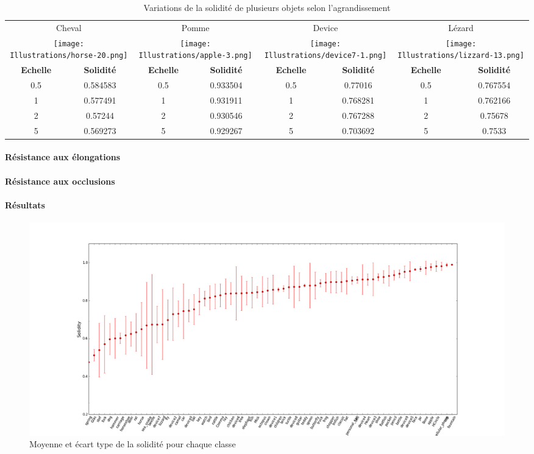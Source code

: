 \documentclass{article}
\theoremstyle{definition}
\begin{document}
	  \begin{table}[!h]
	  \centering
	  \begin{tabular}{|c|c|c|c|c|c|c|c|}
	    \hline
	    \multicolumn{2}{|c|}{Cheval} & \multicolumn{2}{|c|}{Pomme} & \multicolumn{2}{|c|}{Device} & \multicolumn{2}{|c|}{Lézard} \\
	    \multicolumn{2}{|c|}{\texttt{[image: Illustrations/horse-20.png]}} 
	    & \multicolumn{2}{|c|}{\texttt{[image: Illustrations/apple-3.png]}} 
	    & \multicolumn{2}{|c|}{\texttt{[image: Illustrations/device7-1.png]}} 
	    & \multicolumn{2}{|c|}{\texttt{[image: Illustrations/lizzard-13.png]}} \\
	    \hline
	    \textbf{Echelle} & \textbf{Solidité} & \textbf{Echelle} & \textbf{Solidité} & \textbf{Echelle} & \textbf{Solidité} & \textbf{Echelle} & \textbf{Solidité} \\
	    \hline
	    0.5 & 0.584583 & 0.5 & 0.933504 & 0.5 & 0.77016 & 0.5 & 0.767554 \\
	    \hline
	    1 & 0.577491 & 1 & 0.931911 & 1 & 0.768281 & 1 & 0.762166 \\
	    \hline
	    2 & 0.57244 & 2 & 0.930546 & 2 & 0.767288 & 2 & 0.75678 \\
	    \hline
	    5 & 0.569273 & 5 & 0.929267 & 5 & 0.703692 & 5 & 0.7533 \\
	    \hline
	  \end{tabular}
	  \caption{Variations de la solidité de plusieurs objets selon l'agrandissement}
	  \label{solidité-scaling-table}
	  \end{table}
	  
	\paragraph{Résistance aux élongations}
	
	\paragraph{Résistance aux occlusions}
	  
	\paragraph{Résultats}
	
	  \begin{figure}[!h]
	    \begin{bigcenter}
	      \includegraphics[scale=0.38]{Graphes/solidite.png}
	    \end{bigcenter}
	    \caption{Moyenne et écart type de la solidité pour chaque classe}
	    \label{solidité-graph}
	  \end{figure}
\end{document}
